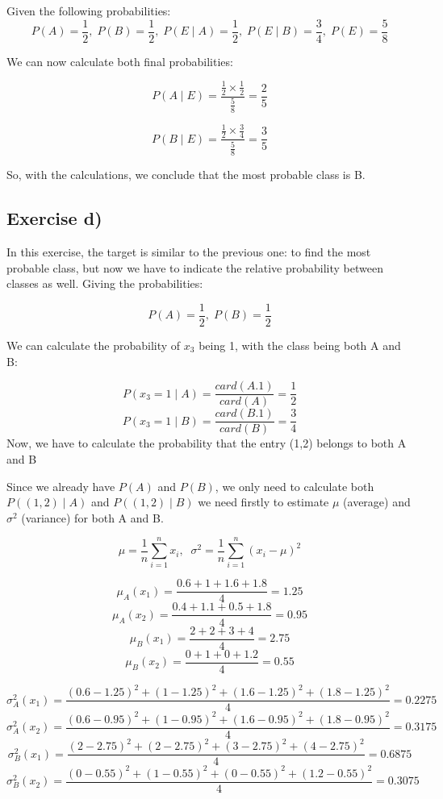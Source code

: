 \documentclass{article}
\begin{document}
Given the following probabilities:
\[
P(A) = \frac{1}{2},\;P(B) = \frac{1}{2},\;P(E \mid A ) = \frac{1}{2},\;P(E \mid B) = \frac{3}{4},\;P(E) = \frac{5}{8}
\]

We can now calculate both final probabilities:

\[P(A \mid E) = \frac{\frac{1}{2} \times \frac{1}{2}}{\frac{5}{8}} = \frac{2}{5}\]

\[P(B \mid E) = \frac{\frac{1}{2} \times \frac{3}{4}}{\frac{5}{8}} = \frac{3}{5}\]

So, with the calculations, we conclude that the most probable class is B.

\newpage

\subsection{Exercise d)}
In this exercise, the target is similar to the previous one: to find the most probable class, but now we have to indicate the relative probability between classes as well.
\newline
\newline
Giving the probabilities:

\[
P(A) = \frac{1}{2},\;P(B) = \frac{1}{2}
\]

We can calculate the probability of \( x_3 \) being 1, with the class being both A and B:

\[
P(x_3 = 1 \mid A) = \frac{card(A.1)}{card(A)} = \frac{1}{2}
\]
\[
P(x_3 = 1 \mid B) = \frac{card(B.1)}{card(B)} = \frac{3}{4}
\]
\newline
Now, we have to calculate the probability that the entry (1,2) belongs to both A and B

Since we already have \( P(A) \) and \( P(B) \), we only need to calculate both \( P((1,2) \mid A) \) and \( P((1,2) \mid B) \)
we need firstly to estimate \( \mu \) (average) and \(\sigma^2\) (variance) for both A and B.

\[
\mu = \frac{1}{n}\sum_{i = 1}^n x_i, \;\;\sigma^2 = \frac{1}{n}\sum_{i = 1}^n (x_i - \mu)^2
\]

\[
\mu_A(x_1) = \frac{0.6+1+1.6+1.8}{4} = 1.25
\]
\[
\mu_A(x_2) = \frac{0.4+1.1+0.5+1.8}{4} = 0.95
\]
\[
\mu_B(x_1) = \frac{2+2+3+4}{4} = 2.75
\]
\[
\mu_B(x_2) = \frac{0+1+0+1.2}{4} = 0.55
\]

\[
\sigma^2_A(x_1) = \frac{(0.6-1.25)^2 + (1 - 1.25)^2 + (1.6 - 1.25)^2 + (1.8 - 1.25)^2}{4} = 0.2275
\]
\[
\sigma^2_A(x_2) = \frac{(0.6-0.95)^2 + (1 - 0.95)^2 + (1.6 - 0.95)^2 + (1.8 - 0.95)^2}{4} = 0.3175
\]
\[
\sigma^2_B(x_1) = \frac{(2 - 2.75)^2 + (2 - 2.75)^2 + (3 - 2.75)^2 + (4 - 2.75)^2}{4} = 0.6875
\]
\[
\sigma^2_B(x_2) = \frac{(0 - 0.55)^2 + (1 - 0.55)^2 + (0 - 0.55)^2 + (1.2 - 0.55)^2}{4} = 0.3075
\]
\newpage
\end{document}
